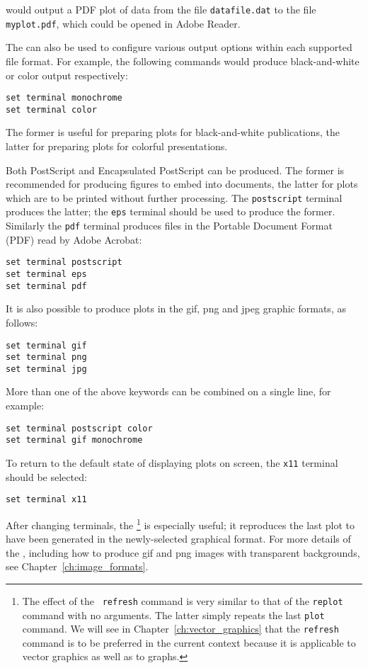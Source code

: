 \noindent would output a PDF plot of data from the file {\tt datafile.dat} to the file
{\tt myplot.pdf}, which could be opened in Adobe Reader.

The  can also be used to configure various output options
within each supported file format.  For example, the following commands would
produce black-and-white or color output respectively:

\begin{verbatim}
set terminal monochrome
set terminal color
\end{verbatim}

\noindent The former is useful for preparing plots for black-and-white
publications, the latter for preparing plots for colorful presentations.

Both PostScript and Encapsulated PostScript can be produced. The former is
recommended for producing figures to embed into documents, the latter for plots
which are to be printed without further processing. The {\tt postscript}
terminal produces the latter; the {\tt eps} terminal should be used to produce
the former.  Similarly the {\tt pdf} terminal produces files in the Portable
Document Format (PDF) read by Adobe Acrobat:

\begin{verbatim}
set terminal postscript
set terminal eps
set terminal pdf
\end{verbatim}

It is also possible to produce plots in the gif, png and jpeg graphic formats,
as follows:

\begin{verbatim}
set terminal gif
set terminal png
set terminal jpg
\end{verbatim}

More than one of the above keywords can be combined on a single line, for
example:

\begin{verbatim}
set terminal postscript color
set terminal gif monochrome
\end{verbatim}

To return to the default state of displaying plots on screen, the {\tt x11}
terminal should be selected:

\begin{verbatim}
set terminal x11
\end{verbatim}

After changing terminals, the \footnote{The effect of the {\tt
refresh} command is very similar to that of the {\tt replot} command with no
arguments. The latter simply repeats the last {\tt plot} command. We will see
in Chapter~\ref{ch:vector_graphics} that the {\tt refresh} command is to be
preferred in the current context because it is applicable to vector graphics as
well as to graphs.} is especially useful; it reproduces the last plot to have
been generated in the newly-selected graphical format.  For more details of the
, including how to produce gif and png images with
transparent backgrounds, see Chapter~\ref{ch:image_formats}.

